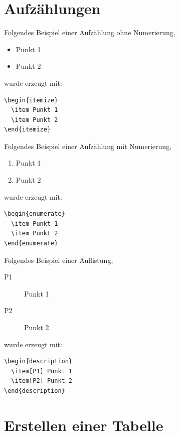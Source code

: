 \section{Aufzählungen}\label{sec:aufz}

Folgendes Beispiel einer Aufzählung ohne Numerierung,
\begin{itemize}
  \item Punkt 1
  \item Punkt 2
\end{itemize}
wurde erzeugt mit:
\begin{verbatim}
\begin{itemize}
  \item Punkt 1
  \item Punkt 2
\end{itemize}
\end{verbatim}

Folgendes Beispiel einer Aufzählung mit Numerierung,
\begin{enumerate}
  \item Punkt 1
  \item Punkt 2
\end{enumerate}
wurde erzeugt mit:
\begin{verbatim}
\begin{enumerate}
  \item Punkt 1
  \item Punkt 2
\end{enumerate}
\end{verbatim}

Folgendes Beispiel einer Auflistung,
\begin{description}
  \item[P1] Punkt 1
  \item[P2] Punkt 2
\end{description}
wurde erzeugt mit:
\begin{verbatim}
\begin{description}
  \item[P1] Punkt 1
  \item[P2] Punkt 2
\end{description}
\end{verbatim}


\section{Erstellen einer Tabelle}\label{sec:tabellen}

